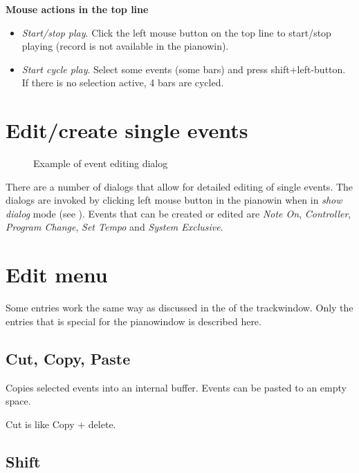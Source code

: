 \documentclass[letterpaper]{report}
\begin{document}
{\bf Mouse actions in the top line}

\begin{itemize}
\item {\em Start/stop play}. Click the left mouse button on the top line to
start/stop playing (record is not available in the pianowin).
\item {\em Start cycle play}. Select some events (some bars) and press
shift+left-button. If there is no selection active, 4 bars are cycled.
\end{itemize}


\section{Edit/create single events}\label{pweventedit}

\begin{figure}%
%
%
\caption{Example of event editing dialog}%
\end{figure}

There are a number of dialogs that allow for detailed editing of single events.
The dialogs are invoked by clicking left mouse button in the pianowin when
in {\em show dialog} mode (see ). Events that
can be created or edited are {\em Note On}, {\em Controller},
{\em Program Change}, {\em Set Tempo} and {\em System Exclusive}.


\section{Edit menu}

Some entries work the same way as discussed in the 
of the trackwindow. Only the entries that is special for the pianowindow is
described here.

\subsection{Cut, Copy, Paste}\label{pwcutpaste}
Copies selected events into an internal buffer. Events can be pasted to an
empty space.

Cut is like Copy + delete.

\subsection{Shift}\label{pwshift}
\end{document}
